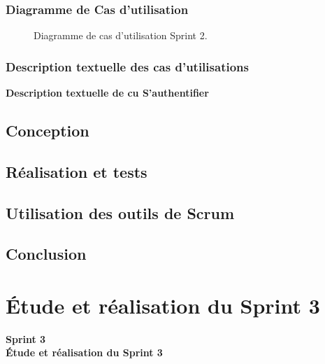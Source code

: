\documentclass[a4paper,11pt]{report}
\begin{document}
\subsection{Diagramme de Cas d'utilisation}


\begin{figure}[H]
  \centering
  \setlength{\fboxrule}{1pt}
  \setlength{\fboxsep}{3pt}
  \caption{Diagramme de cas d’utilisation Sprint 2.}
  \label{fig:clone-result}
\end{figure}
\subsection{ Description textuelle des cas d’utilisations}

\textbf{Description textuelle de cu S'authentifier}




\newpage

\section{Conception}

\section{Réalisation et tests}

\section{Utilisation des outils de Scrum}

\section{Conclusion}


\newpage

\chapter{Étude et réalisation du Sprint 3}
\thispagestyle{empty}

\vspace{2cm}
\begin{center}
  {\Huge\bfseries Sprint 3}\\[0.8em]
  {\LARGE\bfseries Étude et réalisation du Sprint 3}
\end{center}
\end{document}

